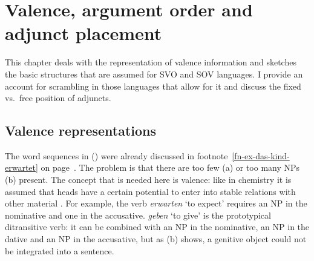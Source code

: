\chapter{Valence, argument order and adjunct placement}
\label{chap-valence}


This chapter deals with the representation of valence information and sketches the basic structures that
are assumed for SVO and SOV languages. I provide an account for scrambling in those languages that
allow for it and discuss the fixed vs.\ free position of adjuncts.

\section{Valence representations}
\label{sec-valence}

The word sequences in () were already discussed in footnote~\ref{fn-ex-das-kind-erwartet} on
page~\pageref{fn-ex-das-kind-erwartet}.
\eal
{}
\zl
The problem is that there are too few (a) or too many NPs (b) present. The concept
that is needed here is valence: like in chemistry it is assumed that heads have a certain potential
to enter into stable relations with other material \citep[]{Tesniere2015a-u}. For example,
the verb \emph{erwarten} `to expect' requires an NP in the nominative and one in the
accusative. \emph{geben} `to give' is the prototypical ditransitive verb: it can be combined with an
NP in the nominative, an NP in the dative and an NP in the accusative, but as (b) shows, a
genitive object could not be integrated into a sentence. 

